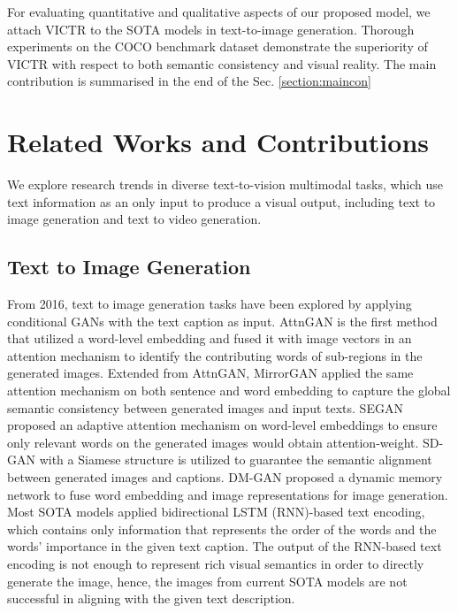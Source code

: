 \documentclass[11pt]{article}
\begin{document}
For evaluating quantitative and qualitative aspects of our proposed model, we attach VICTR to the SOTA models in text-to-image generation. Thorough experiments on the COCO benchmark dataset demonstrate the superiority of VICTR with respect to both semantic consistency and visual reality. The main contribution is summarised in the end of the Sec. \ref{section:maincon}


\section{Related Works and Contributions} 
We explore research trends in diverse text-to-vision multimodal tasks, which use text information as an only input to produce a visual output, including text to image generation and text to video generation.

\subsection{Text to Image Generation}
From 2016, text to image generation tasks have been explored by applying conditional GANs 
\cite{reed2016generative,zhang2017stackgan,zhang2018photographic} with the text caption as input. AttnGAN \cite{xu2018attngan} is the first method that utilized a word-level embedding and fused it with image vectors in an attention mechanism to identify the contributing words of sub-regions in the generated images. Extended from AttnGAN, MirrorGAN \cite{qiao2019mirrorgan} applied the same attention mechanism on both sentence and word embedding to capture the global semantic consistency between generated images and input texts. SEGAN \cite{tan2019semantics} proposed an adaptive attention mechanism on word-level embeddings to ensure only relevant words on the generated images would obtain attention-weight. SD-GAN \cite{yin2019semantics} with a Siamese structure is utilized to guarantee the semantic alignment between generated images and captions. DM-GAN \cite{zhu2019dm} proposed a dynamic memory network to fuse word embedding and image representations for image generation. Most SOTA models applied bidirectional LSTM (RNN)-based text encoding, which contains only information that represents the order of the words and the words' importance in the given text caption. The output of the RNN-based text encoding is not enough to represent rich visual semantics in order to directly generate the image, hence, the images from current SOTA models are not successful in aligning with the given text description.
\end{document}
